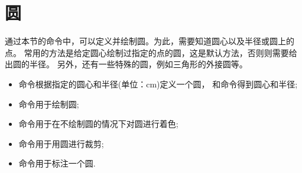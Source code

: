 \documentclass[../main.tex]{subfiles}
\begin{document}
\section{圆}

通过本节的命令中，可以定义并绘制圆。为此，需要知道圆心以及半径或圆上的点。
常用的方法是给定圆心绘制过指定的点的圆，这是默认方法，否则则需要给
出圆的半径。
另外，还有一些特殊的圆，例如三角形的外接圆等。

%
%
%
%
\begin{itemize}
\item  {}命令根据指定的圆心和半径(单位：cm)定义一个圆，
和命令得到圆心和半径;

\item {}命令用于绘制圆;

\item {}命令用于在不绘制圆的情况下对圆进行着色;

\item {}命令用于用圆进行裁剪;

\item {}命令用于标注一个圆.
\end{itemize}
\end{document}
